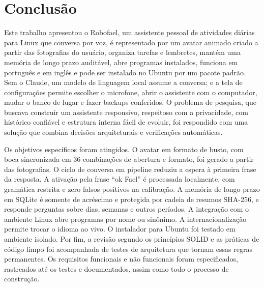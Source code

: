 \chapter{Conclusão}

Este trabalho apresentou o Robofael, um assistente pessoal de atividades diárias para Linux que
conversa por voz, é representado por um avatar animado criado a partir das fotografias do usuário,
organiza tarefas e lembretes, mantém uma memória de longo prazo auditável, abre programas instalados,
funciona em português e em inglês e pode ser instalado no Ubuntu por um pacote padrão. Sem o Claude, um
modelo de linguagem local assume a conversa; e a tela de configurações permite escolher o microfone,
abrir o assistente com o computador, mudar o banco de lugar e fazer backups conferidos. O problema de
pesquisa, que buscava construir um assistente responsivo, respeitoso com a privacidade, com histórico
confiável e estrutura interna fácil de evoluir, foi respondido com uma solução que combina decisões
arquiteturais e verificações automáticas.

Os objetivos específicos foram atingidos. O avatar em formato de busto, com boca sincronizada em
36 combinações de abertura e formato, foi gerado a partir das fotografias. O ciclo de conversa em
pipeline reduziu a espera à primeira frase da resposta. A ativação pela frase “ok Fael” é processada
localmente, com gramática restrita e zero falsos positivos na calibração. A memória de longo prazo em
SQLite é somente de acréscimo e protegida por cadeia de resumos SHA-256, e responde perguntas sobre dias,
semanas e outros períodos. A integração com o ambiente Linux abre programas por nome ou sinônimo. A
internacionalização permite trocar o idioma ao vivo. O instalador para Ubuntu foi testado em ambiente
isolado. Por fim, a revisão segundo os princípios SOLID e as práticas de código limpo foi acompanhada de
testes de arquitetura que tornam essas regras permanentes. Os requisitos funcionais e não funcionais
foram especificados, rastreados até os testes e documentados, assim como todo o processo de construção.

